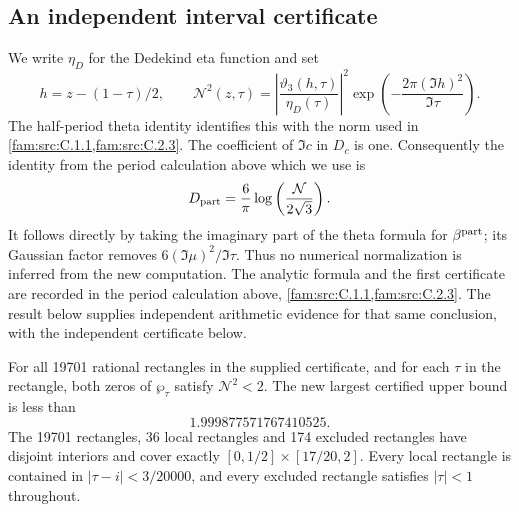 \subsection{An independent interval certificate}\label{push:section:E.4}
\label{sec:e4}

We write $\eta_D$ for the Dedekind eta function and set
\[
 h=z-(1-\tau)/2,\qquad
 \mathcal N^2(z,\tau)=
 \left|\frac{\vartheta_3(h,\tau)}{\eta_D(\tau)}\right|^2
 \exp\left(-\frac{2\pi(\Im h)^2}{\Im\tau}\right).
\]
The half-period theta identity identifies this with the norm used in
\cref{fam:src:C.1.1,fam:src:C.2.3}. The coefficient of $\Im c$ in $D_c$ is one. Consequently the
identity from the period calculation above which we use is
\[
 D_{\rm part}=\frac6\pi
 \log\left(\frac{\mathcal N}{2\sqrt3}\right).
\]
It follows directly by taking the imaginary part of the theta formula
for $\beta^{\rm part}$; its Gaussian factor removes
$6(\Im\mu)^2/\Im\tau$. Thus no numerical normalization is inferred
from the new computation. The analytic formula and the first
certificate are recorded in the period calculation above, \cref{fam:src:C.1.1,fam:src:C.2.3}. The result below supplies independent
arithmetic evidence for that same conclusion, with the independent certificate below.

\begin{theorem}\label{push:src:E.4.1}
For all 19701 rational rectangles in the supplied certificate, and for
each $\tau$ in the rectangle, both zeros of $\wp_\tau$ satisfy
$\mathcal N^2<2$. The new largest certified upper bound is less than
\[
 1.999877571767410525.
\]
The 19701 rectangles, 36 local rectangles and 174 excluded rectangles
have disjoint interiors and cover exactly
$[0,1/2]\times[17/20,2]$. Every local rectangle is contained in
$|\tau-i|<3/20000$, and every excluded rectangle satisfies
$|\tau|<1$ throughout.
\end{theorem}


